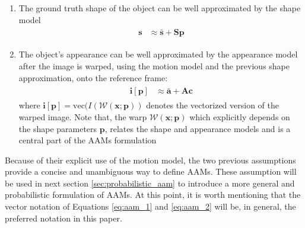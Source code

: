 \begin{enumerate}
	\item The ground truth shape of the object can be well approximated by the shape model
	\begin{eqnarray}
		\begin{aligned}
			\mathbf{s} & \approx \mathbf{\bar{s}} + \mathbf{S} \mathbf{p}
		\end{aligned}
	    \label{eq:aam_1}
	\end{eqnarray}

	\item The object's appearance can be well approximated by the appearance model after the image is warped, using the motion model and the previous shape approximation, onto the reference frame:
	\begin{eqnarray}
		\begin{aligned}
			\mathbf{i}[\mathbf{p}] & \approx \mathbf{\bar{a}} + \mathbf{A} \mathbf{c} 
		\end{aligned}
	    \label{eq:aam_2}
	\end{eqnarray}
	where $\mathbf{i}[\mathbf{p}] = \mathrm{vec}(I(\mathcal{W}(\mathbf{x}; \mathbf{p}))$ denotes the vectorized version of the warped image. Note that, the warp $\mathcal{W}(\mathbf{x}; \mathbf{p})$ which explicitly depends on the shape parameters $\mathbf{p}$, relates the shape and appearance models and is a central part of the AAMs formulation
\end{enumerate}

Because of their explicit use of the motion model, the two previous assumptions provide a concise and unambiguous way to define AAMs. These assumption will be used in next section \ref{sec:probabilistic_aam} to introduce a more general and probabilistic formulation of AAMs. At this point, it is worth mentioning that the vector notation of Equations \ref{eq:aam_1} and \ref{eq:aam_2} will be, in general, the preferred notation in this paper.


